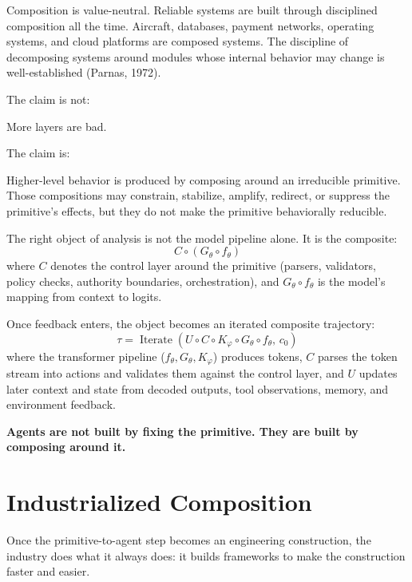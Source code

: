 \documentclass[11pt]{article}
\DeclareMathOperator{\Iterate}{Iterate}
\begin{document}
Composition is value-neutral. Reliable systems are built through disciplined composition all the time. Aircraft, databases, payment networks, operating systems, and cloud platforms are composed systems. The discipline of decomposing systems around modules whose internal behavior may change is well-established (Parnas, 1972).

The claim is not:

\begin{pullquote}
More layers are bad.
\end{pullquote}

The claim is:

\begin{pullquote}
Higher-level behavior is produced by composing around an irreducible primitive. Those compositions may constrain, stabilize, amplify, redirect, or suppress the primitive's effects, but they do not make the primitive behaviorally reducible.
\end{pullquote}

The right object of analysis is not the model pipeline alone. It is the composite:
\[
C \circ (G_\theta \circ f_\theta)
\]
where $C$ denotes the control layer around the primitive (parsers, validators, policy checks, authority boundaries, orchestration), and $G_\theta \circ f_\theta$ is the model's mapping from context to logits.

Once feedback enters, the object becomes an iterated composite trajectory:
\[
\tau = \Iterate(U \circ C \circ K_\varphi \circ G_\theta \circ f_\theta,\, c_0)
\]
where the transformer pipeline ($f_\theta, G_\theta, K_\varphi$) produces tokens, $C$ parses the token stream into actions and validates them against the control layer, and $U$ updates later context and state from decoded outputs, tool observations, memory, and environment feedback.

\begin{pullquote}
\textbf{Agents are not built by fixing the primitive. They are built by composing around it.}
\end{pullquote}

\section{Industrialized Composition}

Once the primitive-to-agent step becomes an engineering construction, the industry does what it always does: it builds frameworks to make the construction faster and easier.
\end{document}
